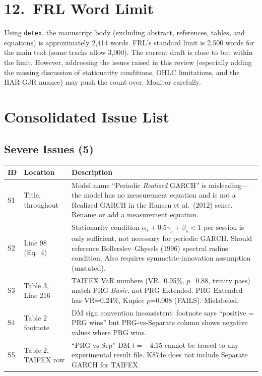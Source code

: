 \documentclass[12pt,a4paper]{article}
\begin{document}
\bigskip

\section*{12.\ FRL Word Limit}

Using \texttt{detex}, the manuscript body (excluding abstract, references, tables, and equations) is approximately 2,414 words. FRL's standard limit is 2,500 words for the main text (some tracks allow 3,000). The current draft is close to but within the limit. However, addressing the issues raised in this review (especially adding the missing discussion of stationarity conditions, OHLC limitations, and the HAR-GJR nuance) may push the count over. Monitor carefully.

\bigskip

\section*{Consolidated Issue List}

\subsection*{\textcolor{errorred}{Severe Issues (5)}}

\begin{longtable}{p{1.2cm}p{2.5cm}p{10cm}}
\toprule
ID & Location & Description \\
\midrule
S1 & Title, throughout & Model name ``Periodic \emph{Realized} GARCH'' is misleading---the model has no measurement equation and is not a Realized GARCH in the Hansen et al.\ (2012) sense. Rename or add a measurement equation. \\
S2 & Line 98 (Eq.~4) & Stationarity condition $\alpha_s + 0.5\gamma_s + \beta_s < 1$ per session is only sufficient, not necessary for periodic GARCH. Should reference Bollerslev--Ghysels (1996) spectral radius condition. Also requires symmetric-innovation assumption (unstated). \\
S3 & Table 3, Line 216 & TAIFEX VaR numbers (VR=0.95\%, $p$=0.88, trinity pass) match PRG \emph{Basic}, not PRG Extended. PRG Extended has VR=0.24\%, Kupiec $p$=0.008 (FAILS). Mislabeled. \\
S4 & Table 2 footnote & DM sign convention inconsistent: footnote says ``positive = PRG wins'' but PRG-vs-Separate column shows negative values where PRG wins. \\
S5 & Table 2, TAIFEX row & ``PRG vs Sep'' DM $t=-4.15$ cannot be traced to any experimental result file. K874e does not include Separate GARCH for TAIFEX. \\
\bottomrule
\end{longtable}
\end{document}
